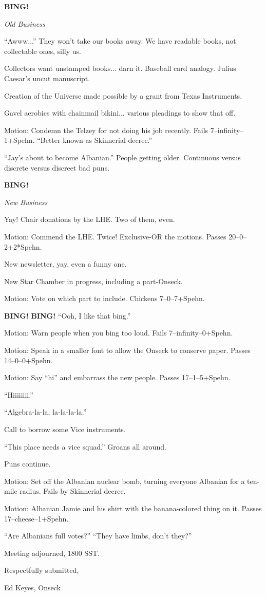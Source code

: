 \documentclass[12pt]{article}
\newcommand{\bing}{{\bf BING!} }
\newcommand{\goto}[1]{\bing \vskip 12pt \centerline{{\em{#1}}}}
\begin{document}
\goto{Old Business}

``Awww...''  They won't take our books away.  We have readable books, not
collectable ones, silly us.

Collectors want unstamped books... darn it.  Baseball card analogy.  Julius
Caesar's uncut manuscript.

Creation of the Universe made possible by a grant from Texas Instruments.

Gavel aerobics with chainmail bikini... various pleadings to show that off.

Motion: Condemn the Telzey for not doing his job recently.  Fails
7--infinity--1+Spehn.  ``Better known as Skinnerial decree.''

``Jay's about to become Albanian.''  People getting older.  Continuous
versus discrete versus discreet bad puns.

\goto{New Business}

Yay!  Chair donations by the LHE.  Two of them, even.

Motion: Commend the LHE.  Twice!  Exclusive-OR the motions.  Passes
20--0--2+2*Spehn.

New newsletter, yay, even a funny one.

New Star Chamber in progress, including a part-Onseck.

Motion: Vote on which part to include.  Chickens 7--0--7+Spehn.

\bing \bing  ``Ooh, I like that bing.''

Motion: Warn people when you bing too loud.  Fails 7--infinity--0+Spehn.

Motion: Speak in a smaller font to allow the Onseck to conserve paper.
Passes 14--0--0+Spehn.

Motion: Say ``hi'' and embarrass the new people.  Passes 17--1--5+Spehn.

``Hiiiiiiii.''

``Algebra-la-la, la-la-la-la.''

Call to borrow some Vice instruments.

``This place needs a vice squad.''  Groans all around.

Puns continue.

Motion: Set off the Albanian nuclear bomb, turning everyone Albanian
for a ten-mile radius.  Fails by Skinnerial decree.

Motion: Albanian Jamie and his shirt with the banana-colored thing
on it.  Passes 17--cheese--1+Spehn.

``Are Albanians full votes?''  ``They have limbs, don't they?''

\vspace{12pt}

\noindent
Meeting adjourned, 1800 SST.

\vspace{18pt}

\centerline{Respectfully submitted,}
\centerline{Ed Keyes, Onseck}
\end{document}
